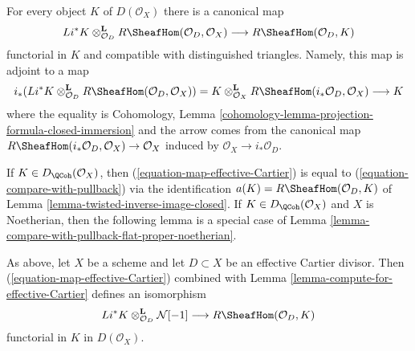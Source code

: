 \noindent
For every object $K$ of $D(\mathcal{O}_X)$ there is a canonical map
\begin{equation}
\label{equation-map-effective-Cartier}
Li^*K
\otimes_{\mathcal{O}_D}^\mathbf{L}
R\SheafHom(\mathcal{O}_D, \mathcal{O}_X)
\longrightarrow
R\SheafHom(\mathcal{O}_D, K)
\end{equation}
functorial in $K$ and compatible with distinguished triangles.
Namely, this map is adjoint to a map
$$
i_*(Li^*K \otimes^\mathbf{L}_{\mathcal{O}_D}
R\SheafHom(\mathcal{O}_D, \mathcal{O}_X)) =
K \otimes^\mathbf{L}_{\mathcal{O}_X}
R\SheafHom(i_*\mathcal{O}_D, \mathcal{O}_X)
\longrightarrow K
$$
where the equality is
Cohomology, Lemma \ref{cohomology-lemma-projection-formula-closed-immersion}
and the arrow comes from the canonical map
$R\SheafHom(i_*\mathcal{O}_D, \mathcal{O}_X) \to \mathcal{O}_X$
induced by $\mathcal{O}_X \to i_*\mathcal{O}_D$.

\medskip\noindent
If $K \in D_\QCoh(\mathcal{O}_X)$, then
(\ref{equation-map-effective-Cartier}) is equal to
(\ref{equation-compare-with-pullback}) via the identification
$a(K) = R\SheafHom(\mathcal{O}_D, K)$ of
Lemma \ref{lemma-twisted-inverse-image-closed}.
If $K \in D_\QCoh(\mathcal{O}_X)$ and $X$ is Noetherian, then
the following lemma is a special case of
Lemma \ref{lemma-compare-with-pullback-flat-proper-noetherian}.

\begin{lemma}
\label{lemma-sheaf-with-exact-support-effective-Cartier}
As above, let $X$ be a scheme and let $D \subset X$ be an
effective Cartier divisor. Then (\ref{equation-map-effective-Cartier})
combined with Lemma \ref{lemma-compute-for-effective-Cartier}
defines an isomorphism
$$
Li^*K \otimes_{\mathcal{O}_D}^\mathbf{L} \mathcal{N}[-1]
\longrightarrow
R\SheafHom(\mathcal{O}_D, K)
$$
functorial in $K$ in $D(\mathcal{O}_X)$.
\end{lemma}

